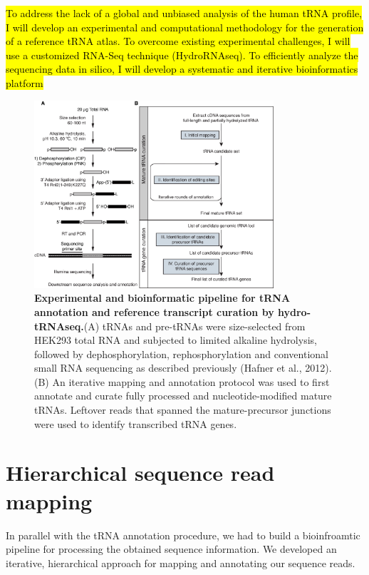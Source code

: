 \documentclass[12pt]{rockefeller}
\begin{document}
\hl{To address the lack of a global and unbiased analysis of the human tRNA profile, I will develop an experimental and computational methodology for the generation of a reference tRNA atlas. To overcome existing experimental challenges, I will use a customized RNA-Seq technique (HydroRNAseq). To efficiently analyze the sequencing data in silico, I will develop a systematic and iterative bioinformatics platform}



\begin{figure}[!ht]%
\centering
\includegraphics[width=3.5in]{paper1.png}%
\caption[Experimental and bioinformatic pipeline for tRNA annotation and reference transcript curation by hydro-tRNAseq]{\textbf{Experimental and bioinformatic pipeline for tRNA annotation and reference transcript curation by hydro-tRNAseq.}(A) tRNAs and pre-tRNAs were size-selected from HEK293 total RNA and subjected to limited alkaline hydrolysis, followed by dephosphorylation, rephosphorylation and conventional small RNA sequencing as described previously (Hafner et al., 2012). (B) An iterative mapping and annotation protocol was used to first annotate and curate fully processed and nucleotide-modified mature tRNAs. Leftover reads that spanned the mature-precursor junctions were used to identify transcribed tRNA genes.}
\centering
\label{paper1}%
\end{figure}

\section{Hierarchical sequence read mapping}
In parallel with the tRNA annotation procedure, we had to build a bioinfroamtic pipeline for processing the obtained sequence information.
We developed an iterative, hierarchical approach for mapping and annotating our sequence reads. 
\end{document}
